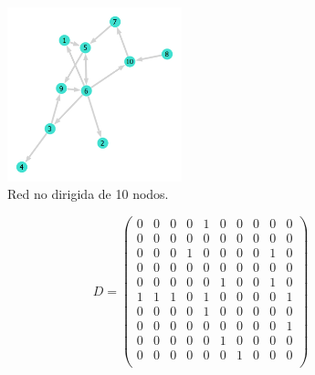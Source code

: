 \begin{figure} \vspace{-30pt} \begin{center}
		\includegraphics[width=0.45\textwidth]{../Imagenes/Red10Dir} 
	\end{center} 
	\vspace{-20pt} 
	\caption{Red no dirigida de 10 nodos.} 
	\vspace{-120pt}
	\label{fig:Red10Dir}
\end{figure} 
$$
D = \begin{pmatrix}
	0 & 0 & 0 & 0 & 1 & 0 & 0 & 0 & 0 & 0\\
	0 & 0 & 0 & 0 & 0 & 0 & 0 & 0 & 0 & 0\\
	0 & 0 & 0 & 1 & 0 & 0 & 0 & 0 & 1 & 0\\
	0 & 0 & 0 & 0 & 0 & 0 & 0 & 0 & 0 & 0\\
	0 & 0 & 0 & 0 & 0 & 1 & 0 & 0 & 1 & 0\\
	1 & 1 & 1 & 0 & 1 & 0 & 0 & 0 & 0 & 1\\
	0 & 0 & 0 & 0 & 1 & 0 & 0 & 0 & 0 & 0\\
	0 & 0 & 0 & 0 & 0 & 0 & 0 & 0 & 0 & 1\\
	0 & 0 & 0 & 0 & 0 & 1 & 0 & 0 & 0 & 0\\
	0 & 0 & 0 & 0 & 0 & 0 & 1 & 0 & 0 & 0\\
\end{pmatrix}
$$


